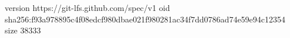 version https://git-lfs.github.com/spec/v1
oid sha256:f93a978895c4f08edcf980dbae021f980281ac34f7dd0786ad74e59e94c12354
size 38333
